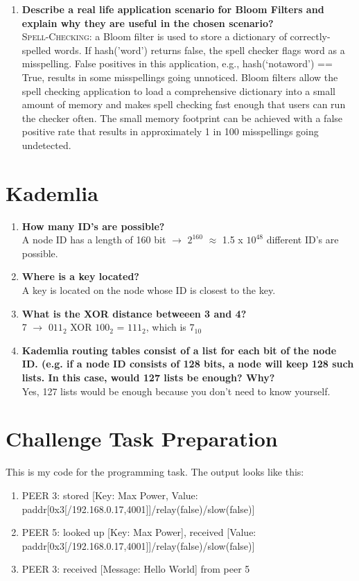 \documentclass{article}
\begin{document}
\begin{enumerate}[1]
\item \textbf{Describe a real life application scenario for Bloom Filters and explain why they are useful in the chosen scenario?} \\ \textsc{Spell-Checking}: a Bloom filter is used to store a dictionary of correctly-spelled words. If hash('word') returns false, the spell checker flags word as a misspelling. False positives in this application, e.g., hash(‘notaword’) == True, results in some misspellings going unnoticed. Bloom filters allow the spell checking application to load a comprehensive dictionary into a small amount of memory and makes spell checking fast enough that users can run the checker often. The small memory footprint can be achieved with a false positive rate that results in approximately 1 in 100 misspellings going undetected. \\ 
\end{enumerate}

\section{Kademlia}
\begin{enumerate}[1]
\item \textbf{How many ID's are possible?} \\ A node ID has a length of 160 bit $\rightarrow$ $2^{160}$ $\approx$ 1.5 x $10^{48}$ different ID's are possible.

\item \textbf{Where is a key located?} \\ A key is located on the node whose ID is closest to the key.

\item \textbf{What is the XOR distance betweeen 3 and 4?} \\ 7 $\rightarrow$ $011_{2}$ XOR $100_{2}$ = $111_{2}$, which is $7_{10}$

\item \textbf{Kademlia routing tables consist of a list for each bit of the node ID. (e.g. if a node ID consists of 128 bits, a node will keep 128 such lists. In this case, would 127 lists be enough? Why?} \\ Yes, 127 lists would be enough because you don't need to know yourself. \\
\end{enumerate}

\section{Challenge Task Preparation}
This is my code for the programming task. The output looks like this: 
\begin{enumerate}[]
	\item PEER 3: stored [Key: Max Power, Value: paddr[0x3[/192.168.0.17,4001]]/relay(false)/slow(false)]
	\item PEER 5: looked up [Key: Max Power], received [Value: paddr[0x3[/192.168.0.17,4001]]/relay(false)/slow(false)]
	\item PEER 3: received [Message: Hello World] from peer 5
\end{enumerate}






\end{document}

